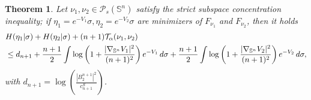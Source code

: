 \documentclass[10pt]{amsart}
\newtheorem{thm}{Theorem}[section]
\theoremstyle{definition}
\theoremstyle{remark}
\newcommand{\Sd}{\mathbb{S}}
\begin{document}
\begin{thm}\label{thm:LSIimproved}
Let $\nu_1,\nu_2 \in \mathcal{P}_s(\Sd^n)$ satisfy the strict subspace concentration inequality; if $\eta_1= e^{-V_1}\sigma,\eta_2=e^{-V_2}\sigma$ are minimizers of $F_{\nu_1}$ and $F_{\nu_2}$, then it holds
\begin{align}\label{eq:LSIimproved}
\notag &H(\eta_1 | \sigma)+ H(\eta_2 | \sigma) + (n+1)\mathcal{T}_\alpha(\nu_1,\nu_2)\\
&\leq d_{n+1} + \frac{n+1}{2}\int \log\left(1+ \frac{|\nabla_{\Sd^n}V_1|^2}{(n+1)^2} \right)e^{-V_{1}}\,d\sigma 
+ \frac{n+1}{2}\int \log\left(1+ \frac{|\nabla_{\Sd^n}V_2|^2}{(n+1)^2} \right)e^{-V_{2}}\,d\sigma,
\end{align}
with $d_{n+1} = \log \left(\frac{|B_2^{n+1}|^2}{c_{n+1}^S}\right)$.
\end{thm}
\end{document}
